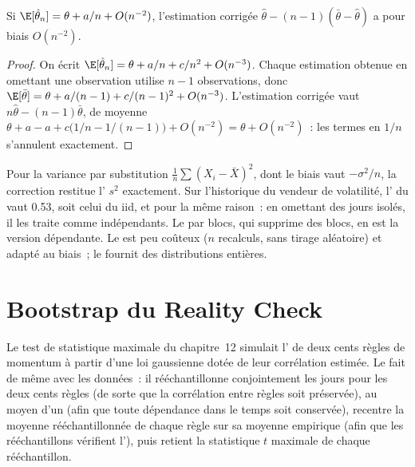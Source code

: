 \begin{proposition}\label{prop:qm:resampling:jack}
Si $\E[\hat\theta_n] = \theta + a/n + O(n^{-2})$, l'estimation corrigée $\hat\theta - (n - 1)(\bar\theta - \hat\theta)$ a pour biais
$O(n^{-2})$.
\end{proposition}

\begin{proof}
On écrit $\E[\hat\theta_n] = \theta + a/n + c/n^2 + O(n^{-3})$. Chaque estimation obtenue en omettant une observation utilise $n - 1$ observations, donc $\E[\bar\theta] =
\theta + a/(n - 1) + c/(n - 1)^2 + O(n^{-3})$. L'estimation corrigée vaut $n\hat\theta - (n - 1)\bar\theta$, de moyenne $\theta + a - a +
c\bigl(1/n - 1/(n - 1)\bigr) + O(n^{-2}) = \theta + O(n^{-2})$~: les termes en $1/n$ s'annulent exactement.
\end{proof}

Pour la variance par substitution $\frac1n\sum(X_i - \bar X)^2$, dont le biais vaut $-\sigma^2/n$, la correction restitue l' $s^2$
exactement. Sur l'historique du vendeur de volatilité, l'  du  vaut 0.53, soit celui du  iid, et
pour la même raison~: en omettant des jours isolés, il les traite comme indépendants. Le  par blocs, qui supprime des blocs, en est la version
dépendante. Le  est peu coûteux ($n$ recalculs, sans tirage aléatoire) et adapté au biais~; le  fournit des distributions entières.

\section{Bootstrap du Reality Check}

Le test de statistique maximale du chapitre~12 simulait l' de deux cents règles de momentum à partir d'une loi gaussienne dotée de leur corrélation estimée.
Le  fait de même avec les données~: il rééchantillonne conjointement les jours pour les deux cents règles (de sorte que la corrélation entre règles soit
préservée), au moyen d'un  (afin que toute dépendance dans le temps soit conservée), recentre la moyenne rééchantillonnée de chaque règle sur sa moyenne empirique (afin que
les rééchantillons vérifient l'), puis retient la statistique $t$ maximale de chaque rééchantillon.

